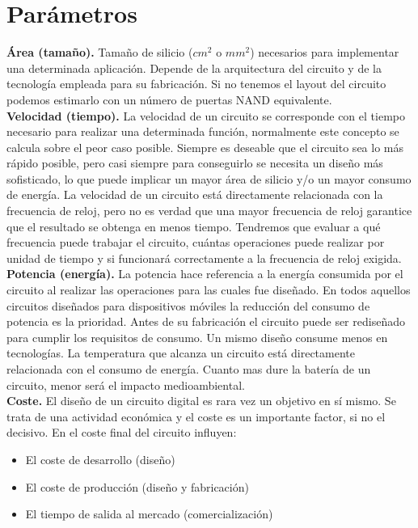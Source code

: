 \section{Parámetros}
\textbf{Área (tamaño).} Tamaño de silicio ($cm^{2}$ o $mm^{2}$) necesarios para implementar una determinada aplicación. Depende de la arquitectura del circuito y de la tecnología empleada para su fabricación. Si no tenemos el layout del circuito podemos estimarlo con un número de puertas NAND equivalente.\\
\textbf{Velocidad (tiempo).} La velocidad de un circuito se corresponde con el tiempo necesario para realizar una determinada función, normalmente este concepto se calcula sobre el peor caso posible. Siempre es deseable que el circuito sea lo más rápido posible, pero casi siempre para conseguirlo se necesita un diseño más sofisticado, lo que puede implicar un mayor área de silicio y/o un mayor consumo de energía. La velocidad de un circuito está directamente relacionada con la frecuencia de reloj, pero no es verdad que una mayor frecuencia de reloj garantice que el resultado se obtenga en menos tiempo. Tendremos que evaluar a qué frecuencia puede trabajar el circuito, cuántas operaciones puede realizar por unidad de tiempo y si funcionará correctamente a la frecuencia de reloj exigida.\\
\textbf{Potencia (energía).} La potencia hace referencia a la energía consumida por el circuito al realizar las operaciones para las cuales fue diseñado. En todos aquellos circuitos diseñados para dispositivos móviles la reducción del consumo de potencia es la prioridad. Antes de su fabricación el circuito puede ser rediseñado para cumplir los requisitos de consumo. Un mismo diseño consume menos en tecnologías. La temperatura que alcanza un circuito está directamente relacionada con el consumo de energía. Cuanto mas dure la batería de un circuito, menor será el impacto medioambiental. \\
\textbf{Coste.} El diseño de un circuito digital es rara vez un objetivo en sí mismo. Se trata de una actividad económica y el coste es un importante factor, si no el decisivo.
En el coste final del circuito influyen:
\begin{itemize}
	\item El coste de desarrollo (diseño)
	\item El coste de producción (diseño y fabricación)
	\item El tiempo de salida al mercado (comercialización)
\end{itemize}


